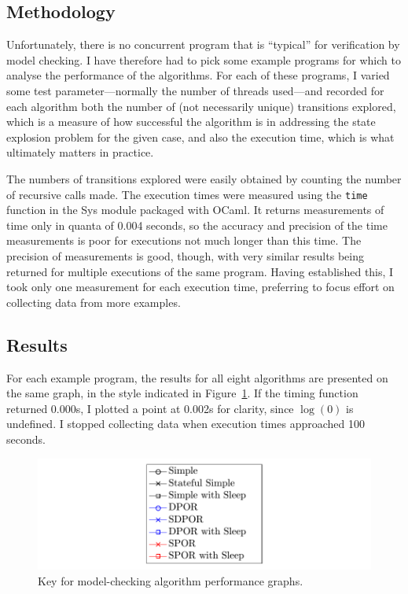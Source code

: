 \documentclass[12pt,a4paper,twoside,openright]{report}
\begin{document}
\subsection{Methodology}
Unfortunately, there is no concurrent program
that is ``typical'' for verification by model
checking. I have therefore had to pick some
example programs for which to analyse the performance
of the algorithms. For each of these programs, I varied
some test parameter---normally the number of threads
used---and recorded for each algorithm
both the number of (not necessarily unique) transitions
explored, which is a measure of how successful
the algorithm is in addressing the state
explosion problem for the given case, and also
the execution time, which is what ultimately
matters in practice.

The numbers of transitions explored were easily
obtained by counting the number of recursive calls made.
The execution times were measured using the \texttt{time}
function in the Sys module packaged with OCaml. It returns
measurements of time only in quanta of 0.004 seconds,
so the accuracy and precision of the time measurements is poor for
executions not much longer than this time.
The precision of measurements
is good, though, with very similar results being returned
for multiple executions of the same program.
Having established this,
I took only one measurement
for each execution time, preferring
to focus effort on collecting data
from more examples.

\subsection{Results}
For each example program, the results for all eight
algorithms are presented on the same graph, in the
style indicated in Figure~\ref{fig:key}.
If the timing function
returned 0.000s, I plotted a point at 0.002s
for clarity, since
$\log(0)$ is undefined.
I stopped collecting data when execution
times approached 100 seconds.

\begin{figure}
	\includegraphics[width=\textwidth]{key}
	\caption{Key for model-checking algorithm performance graphs.}
	\label{fig:key}
\end{figure}
\end{document}
